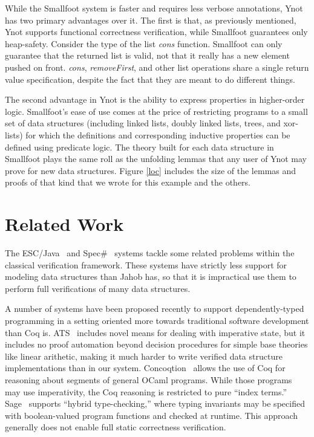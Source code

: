 \documentclass[preprint,nocopyrightspace]{sigplanconf}
\begin{document}
{While the Smallfoot system is faster and requires less verbose
annotations, Ynot has two primary advantages over it. The first is
that, as previously mentioned, Ynot supports functional correctness
verification, while Smallfoot guarantees only heap-safety. Consider
the type of the list {\it cons} function.  Smallfoot can only
guarantee that the returned list is valid, not that it really has a
new element pushed on front.  {\it cons}, {\it removeFirst}, and other
list operations share a single return value specification, despite the
fact that they are meant to do different things.

The second advantage in Ynot is the ability to express properties in
higher-order logic. Smallfoot's ease of use comes at the price of
restricting programs to a small set of data structures (including
linked lists, doubly linked lists, trees, and xor-lists) for which the
definitions and corresponding inductive properties can be defined
using predicate logic. The theory built for each data structure in
Smallfoot plays the same roll as the unfolding lemmas that any user of
Ynot may prove for new data structures.  Figure \ref{loc} includes the
size of the lemmas and proofs of that kind that we wrote for this
example and the others.

\section{Related Work}

The ESC/Java~\cite{esc-java} and Spec\#~\cite{spec-sharp} systems tackle some related problems within the classical verification framework.  These systems have strictly less support for modeling data structures than Jahob has, so that it is impractical use them to perform full verifications of many data structures.

A number of systems have been proposed recently to support dependently-typed programming in a setting oriented more towards traditional software development than Coq is.  ATS~\cite{ats} includes novel means for dealing with imperative state, but it includes no proof automation beyond decision procedures for simple base theories like linear arithetic, making it much harder to write verified data structure implementations than in our system.  Concoqtion~\cite{concoqtion} allows the use of Coq for reasoning about segments of general OCaml programs.  While those programs may use imperativity, the Coq reasoning is restricted to pure ``index terms.''  Sage~\cite{sage} supports ``hybrid type-checking,'' where typing invariants may be specified with boolean-valued program functions and checked at runtime.  This approach generally does not enable full static correctness verification.

}
\end{document}

